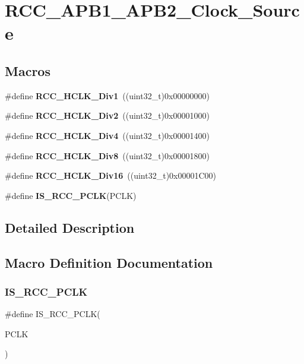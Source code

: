 \section{R\+C\+C\+\_\+\+A\+P\+B1\+\_\+\+A\+P\+B2\+\_\+\+Clock\+\_\+\+Source}
\label{group__RCC__APB1__APB2__Clock__Source}
\subsection*{Macros}
\begin{DoxyCompactItemize}
\item 
\#define \textbf{ R\+C\+C\+\_\+\+H\+C\+L\+K\+\_\+\+Div1}~((uint32\+\_\+t)0x00000000)
\item 
\#define \textbf{ R\+C\+C\+\_\+\+H\+C\+L\+K\+\_\+\+Div2}~((uint32\+\_\+t)0x00001000)
\item 
\#define \textbf{ R\+C\+C\+\_\+\+H\+C\+L\+K\+\_\+\+Div4}~((uint32\+\_\+t)0x00001400)
\item 
\#define \textbf{ R\+C\+C\+\_\+\+H\+C\+L\+K\+\_\+\+Div8}~((uint32\+\_\+t)0x00001800)
\item 
\#define \textbf{ R\+C\+C\+\_\+\+H\+C\+L\+K\+\_\+\+Div16}~((uint32\+\_\+t)0x00001\+C00)
\item 
\#define \textbf{ I\+S\+\_\+\+R\+C\+C\+\_\+\+P\+C\+LK}(P\+C\+LK)
\end{DoxyCompactItemize}


\subsection{Detailed Description}


\subsection{Macro Definition Documentation}
\mbox{\label{group__RCC__APB1__APB2__Clock__Source_gab70f1257ea47c1da4def8e351af4d9f2}} 
\subsubsection{I\+S\+\_\+\+R\+C\+C\+\_\+\+P\+C\+LK}
{\footnotesize\ttfamily \#define I\+S\+\_\+\+R\+C\+C\+\_\+\+P\+C\+LK(\begin{DoxyParamCaption}\item[{}]{P\+C\+LK }\end{DoxyParamCaption})}

